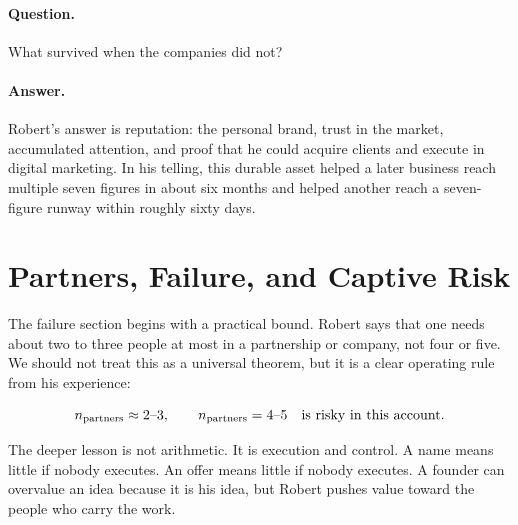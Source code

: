 \paragraph{Question.} What survived when the companies did not?

\paragraph{Answer.} Robert's answer is reputation: the personal brand, trust in the market, accumulated attention, and proof that he could acquire clients and execute in digital marketing. In his telling, this durable asset helped a later business reach multiple seven figures in about six months and helped another reach a seven-figure runway within roughly sixty days.

\section{Partners, Failure, and Captive Risk}

The failure section begins with a practical bound. Robert says that one needs about two to three people at most in a partnership or company, not four or five. We should not treat this as a universal theorem, but it is a clear operating rule from his experience:

\begin{equation}
n_{\mathrm{partners}} \approx 2\hbox{--}3,
\qquad
n_{\mathrm{partners}} = 4\hbox{--}5
\quad
\hbox{is risky in this account.}
\end{equation}

The deeper lesson is not arithmetic. It is execution and control. A name means little if nobody executes. An offer means little if nobody executes. A founder can overvalue an idea because it is his idea, but Robert pushes value toward the people who carry the work.

\begin{figure}
\centering
{}
\end{figure}

